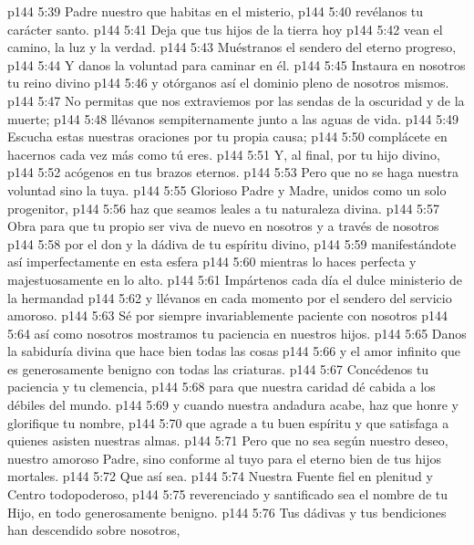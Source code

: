 \separatorline
\vs p144 5:39 Padre nuestro que habitas en el misterio,
\vs p144 5:40 \hsetoff revélanos tu carácter santo.
\vs p144 5:41 Deja que tus hijos de la tierra hoy
\vs p144 5:42 \hsetoff vean el camino, la luz y la verdad.
\vs p144 5:43 Muéstranos el sendero del eterno progreso,
\vs p144 5:44 \hsetoff Y danos la voluntad para caminar en él.
\vs p144 5:45 Instaura en nosotros tu reino divino
\vs p144 5:46 \hsetoff y otórganos así el dominio pleno de nosotros mismos.
\vs p144 5:47 No permitas que nos extraviemos por las sendas de la oscuridad y de la muerte;
\vs p144 5:48 \hsetoff llévanos sempiternamente junto a las aguas de vida.
\vs p144 5:49 Escucha estas nuestras oraciones por tu propia causa;
\vs p144 5:50 \hsetoff complácete en hacernos cada vez más como tú eres.
\vs p144 5:51 Y, al final, por tu hijo divino,
\vs p144 5:52 \hsetoff acógenos en tus brazos eternos.
\vs p144 5:53 Pero que no se haga nuestra voluntad sino la tuya.
\separatorline
\vs p144 5:55 Glorioso Padre y Madre, unidos como un solo progenitor,
\vs p144 5:56 \hsetoff haz que seamos leales a tu naturaleza divina.
\vs p144 5:57 Obra para que tu propio ser viva de nuevo en nosotros y a través de nosotros
\vs p144 5:58 \hsetoff por el don y la dádiva de tu espíritu divino,
\vs p144 5:59 manifestándote así imperfectamente en esta esfera
\vs p144 5:60 \hsetoff mientras lo haces perfecta y majestuosamente en lo alto.
\vs p144 5:61 Impártenos cada día el dulce ministerio de la hermandad
\vs p144 5:62 \hsetoff y llévanos en cada momento por el sendero del servicio amoroso.
\vs p144 5:63 Sé por siempre invariablemente paciente con nosotros
\vs p144 5:64 \hsetoff así como nosotros mostramos tu paciencia en nuestros hijos.
\vs p144 5:65 Danos la sabiduría divina que hace bien todas las cosas
\vs p144 5:66 \hsetoff y el amor infinito que es generosamente benigno con todas las criaturas.
\vs p144 5:67 Concédenos tu paciencia y tu clemencia,
\vs p144 5:68 \hsetoff para que nuestra caridad dé cabida a los débiles del mundo.
\vs p144 5:69 y cuando nuestra andadura acabe, haz que honre y glorifique tu nombre,
\vs p144 5:70 \hsetoff que agrade a tu buen espíritu y que satisfaga a quienes asisten nuestras almas.
\vs p144 5:71 Pero que no sea según nuestro deseo, nuestro amoroso Padre, sino conforme al tuyo para el eterno bien de tus hijos mortales.
\vs p144 5:72 \hsetoff Que así sea.
\separatorline
\vs p144 5:74 Nuestra Fuente fiel en plenitud y Centro todopoderoso,
\vs p144 5:75 \hsetoff reverenciado y santificado sea el nombre de tu Hijo, en todo generosamente benigno.
\vs p144 5:76 Tus dádivas y tus bendiciones han descendido sobre nosotros,
